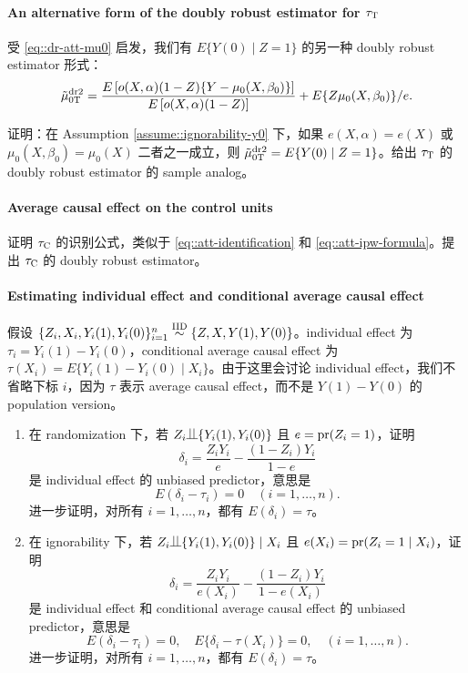 \paragraph{An alternative form of the doubly robust estimator for $\tau_\textsc{T}$}\label{hw::alternative-dr2-robins-att}

受 \eqref{eq::dr-att-mu0} 启发，我们有 $ E\{ Y(0) \mid Z=1 \}  $ 的另一种 doubly robust estimator 形式：
$$
\tilde{\mu}_{0\textsc{T}}^\text{dr2} = 
\frac{  E\left[ o(X,\alpha)   (1-Z) \{ Y - \mu_0(X, \beta_0) \}  \right] }{  E\left[ o(X,\alpha)   (1-Z) \right] } 
  + E\{  Z  \mu_0(X, \beta_0) \} /e.
$$

证明：在 Assumption \ref{assume::ignorability-y0} 下，如果 $e(X,\alpha)  = e(X)$ 或 $\mu_0(X, \beta_0) =  \mu_0(X)$ 二者之一成立，则 $\tilde{\mu}_{0\textsc{T}}^\text{dr2}= E\{ Y(0) \mid Z=1 \}$。给出 $\tau_\textsc{T}$ 的 doubly robust estimator 的 sample analog。

 



 \paragraph{Average causal effect on the control units}\label{hw::formulas-atc}

证明 $\tau_\textsc{C}$ 的识别公式，类似于 \eqref{eq::att-identification} 和 \eqref{eq::att-ipw-formula}。提出 $\tau_\textsc{C}$ 的 doubly robust estimator。


\paragraph{Estimating individual effect and conditional average causal effect}\label{hw::individual-effect-prediction}

假设 $\{ Z_i, X_i, Y_i(1), Y_i(0) \}_{i=1}^n \stackrel{\textup{IID}}{\sim} \{ Z, X, Y(1), Y(0) \}$。individual effect 为 $\tau_i = Y_i(1) - Y_i(0)$，conditional average causal effect 为 $\tau(X_i) = E\{ Y_i(1) - Y_i(0) \mid X_i  \}$。由于这里会讨论 individual effect，我们不省略下标 $i$，因为 $\tau$ 表示 average causal effect，而不是 $Y(1) - Y(0)$ 的 population version。

\begin{enumerate}
\item
在 randomization 下，若 $Z_i\ind \{ Y_i(1), Y_i(0)  \}$ 且 $e = \textup{pr}(Z_i = 1)$，证明
$$
\delta_i = \frac{Z_i Y_i}{e} - \frac{(1-Z_i)Y_i}{1-e}
$$
是 individual effect 的 unbiased predictor，意思是
$$
E( \delta_i  -  \tau_i ) = 0\quad (i=1,\ldots, n).
$$
进一步证明，对所有 $i=1,\ldots, n$，都有 $E( \delta_i ) = \tau $。

\item
在 ignorability 下，若 $Z_i\ind \{ Y_i(1), Y_i(0)  \}\mid X_i$ 且 $e(X_i) = \textup{pr}(Z_i=1\mid X_i)$，证明
$$
\delta_i = \frac{Z_i Y_i}{ e(X_i) } - \frac{(1-Z_i)Y_i}{1-e(X_i)}
$$
是 individual effect 和 conditional average causal effect 的 unbiased predictor，意思是
$$
E( \delta_i  -  \tau_i ) = 0, \quad
E\{  \delta_i  -  \tau(X_i) \} = 0, \quad (i=1,\ldots, n).
$$
进一步证明，对所有 $i=1,\ldots, n$，都有 $E( \delta_i ) = \tau $。
\end{enumerate}
 


